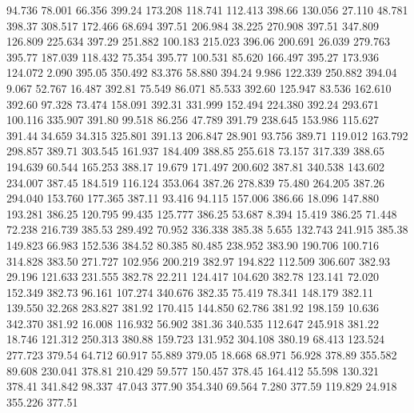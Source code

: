   94.736   78.001   66.356       399.24
 173.208  118.741  112.413       398.66
 130.056   27.110   48.781       398.37
 308.517  172.466   68.694       397.51
 206.984   38.225  270.908       397.51
 347.809  126.809  225.634       397.29
 251.882  100.183  215.023       396.06
 200.691   26.039  279.763       395.77
 187.039  118.432   75.354       395.77
 100.531   85.620  166.497       395.27
 173.936  124.072    2.090       395.05
 350.492   83.376   58.880       394.24
   9.986  122.339  250.882       394.04
   9.067   52.767   16.487       392.81
  75.549   86.071   85.533       392.60
 125.947   83.536  162.610       392.60
  97.328   73.474  158.091       392.31
 331.999  152.494  224.380       392.24
 293.671  100.116  335.907       391.80
  99.518   86.256   47.789       391.79
 238.645  153.986  115.627       391.44
  34.659   34.315  325.801       391.13
 206.847   28.901   93.756       389.71
 119.012  163.792  298.857       389.71
 303.545  161.937  184.409       388.85
 255.618   73.157  317.339       388.65
 194.639   60.544  165.253       388.17
  19.679  171.497  200.602       387.81
 340.538  143.602  234.007       387.45
 184.519  116.124  353.064       387.26
 278.839   75.480  264.205       387.26
 294.040  153.760  177.365       387.11
  93.416   94.115  157.006       386.66
  18.096  147.880  193.281       386.25
 120.795   99.435  125.777       386.25
  53.687    8.394   15.419       386.25
  71.448   72.238  216.739       385.53
 289.492   70.952  336.338       385.38
   5.655  132.743  241.915       385.38
 149.823   66.983  152.536       384.52
  80.385   80.485  238.952       383.90
 190.706  100.716  314.828       383.50
 271.727  102.956  200.219       382.97
 194.822  112.509  306.607       382.93
  29.196  121.633  231.555       382.78
  22.211  124.417  104.620       382.78
 123.141   72.020  152.349       382.73
  96.161  107.274  340.676       382.35
  75.419   78.341  148.179       382.11
 139.550   32.268  283.827       381.92
 170.415  144.850   62.786       381.92
 198.159   10.636  342.370       381.92
  16.008  116.932   56.902       381.36
 340.535  112.647  245.918       381.22
  18.746  121.312  250.313       380.88
 159.723  131.952  304.108       380.19
  68.413  123.524  277.723       379.54
  64.712   60.917   55.889       379.05
  18.668   68.971   56.928       378.89
 355.582   89.608  230.041       378.81
 210.429   59.577  150.457       378.45
 164.412   55.598  130.321       378.41
 341.842   98.337   47.043       377.90
 354.340   69.564    7.280       377.59
 119.829   24.918  355.226       377.51
